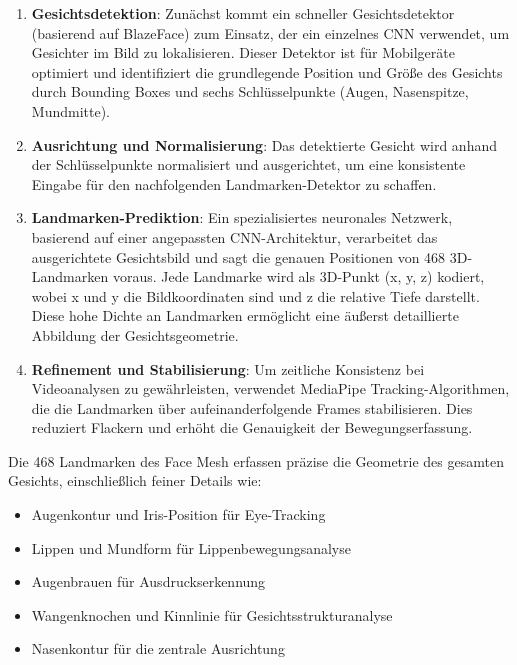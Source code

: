 \begin{enumerate}
    \item \textbf{Gesichtsdetektion}: Zunächst kommt ein schneller Gesichtsdetektor (basierend auf BlazeFace) zum Einsatz, der ein einzelnes CNN verwendet, um Gesichter im Bild zu lokalisieren. Dieser Detektor ist für Mobilgeräte optimiert und identifiziert die grundlegende Position und Größe des Gesichts durch Bounding Boxes und sechs Schlüsselpunkte (Augen, Nasenspitze, Mundmitte).
    
    \item \textbf{Ausrichtung und Normalisierung}: Das detektierte Gesicht wird anhand der Schlüsselpunkte normalisiert und ausgerichtet, um eine konsistente Eingabe für den nachfolgenden Landmarken-Detektor zu schaffen.
    
    \item \textbf{Landmarken-Prediktion}: Ein spezialisiertes neuronales Netzwerk, basierend auf einer angepassten CNN-Architektur, verarbeitet das ausgerichtete Gesichtsbild und sagt die genauen Positionen von 468 3D-Landmarken voraus. Jede Landmarke wird als 3D-Punkt (x, y, z) kodiert, wobei x und y die Bildkoordinaten sind und z die relative Tiefe darstellt. Diese hohe Dichte an Landmarken ermöglicht eine äußerst detaillierte Abbildung der Gesichtsgeometrie.
    
    \item \textbf{Refinement und Stabilisierung}: Um zeitliche Konsistenz bei Videoanalysen zu gewährleisten, verwendet MediaPipe Tracking-Algorithmen, die die Landmarken über aufeinanderfolgende Frames stabilisieren. Dies reduziert Flackern und erhöht die Genauigkeit der Bewegungserfassung.
\end{enumerate}

Die 468 Landmarken des Face Mesh erfassen präzise die Geometrie des gesamten Gesichts, einschließlich feiner Details wie:
\begin{itemize}
    \item Augenkontur und Iris-Position für Eye-Tracking
    \item Lippen und Mundform für Lippenbewegungsanalyse
    \item Augenbrauen für Ausdruckserkennung
    \item Wangenknochen und Kinnlinie für Gesichtsstrukturanalyse
    \item Nasenkontur für die zentrale Ausrichtung
\end{itemize}

